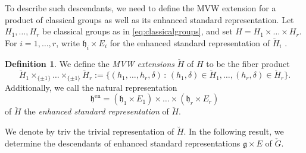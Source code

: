\documentclass[12pt]{amsart}
\theoremstyle{definition}
\newtheorem{defn}[lm]{Definition}
\theoremstyle{remark}\newtheorem{rmk}[lm]{Remark}
\newcommand{\triv}{\mathrm{triv}}
\newcommand{\g}{\mathfrak g}
\newcommand{\h}{\mathfrak h}
\renewcommand{\mid}{\,:\,}
\begin{document}
To describe such descendants, we need to define the MVW extension for a product of classical groups as well as its enhanced standard representation. 
Let $H_1,\dots,H_r$ be classical groups as in \eqref{eq:classicalgroups}, and set $H=H_1\times\dots\times H_r$. 
For $i=1,\dots,r$, write $\h_i\times E_i$ for the enhanced standard representation of $\breve{H}_i$ .

	\begin{defn}
		\label{defn:fiberproduct}
		We define the \emph{MVW extensions} $\breve{H}$ of $H$ to be the fiber product
		\begin{equation*}
			\breve{H}_1\times_{\{\pm 1\}}\dots\times_{\{\pm 1\}}\breve{H}_r:=\{(h_1,\dots,h_r,\delta)\mid (h_1,\delta)\in\breve{H}_1,\dots,(h_r,\delta)\in\breve{H}_r\}.
		\end{equation*}
       Additionally, we call the natural representation
        \begin{equation*}
            \h^{\mathrm{en}}=(\h_1\times E_1)\times\dots\times(\h_r\times E_r)
        \end{equation*}
         of $\breve{H}$ the  \emph{enhanced standard representation} of $\breve{H}$.
	\end{defn}
    
 We denote by $\triv$ the trivial representation of $\breve{H}$. In the following result, we determine the descendants of enhanced standard representations $\g\times E$ of $\check{G}$. 
    
\end{document}

